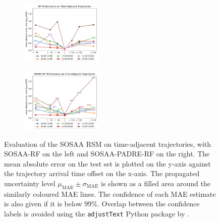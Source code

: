 \begin{figure}[H]
    \centering
    \begin{subfigure}
        \centering
        \includegraphics[width=0.425\textwidth]{evaluation/figures/results/temporal-generalisation-rf.pdf}
    \end{subfigure}
    \begin{subfigure}
        \centering
        \includegraphics[width=0.425\textwidth]{evaluation/figures/results/temporal-generalisation-padre-rf.pdf}
    \end{subfigure}

    \caption[Evaluation of the SOSAA RSM on Time-Adjacent Trajectories]{Evaluation of the SOSAA RSM on time-adjacent trajectories, with SOSAA-RF on the left and SOSAA-PADRE-RF on the right. The mean absolute error on the test set is plotted on the y-axis against the trajectory arrival time offset on the x-axis. The propagated uncertainty level $\mu_{\text{MAE}} \pm \sigma_{\text{MAE}}$ is shown as a filled area around the similarly coloured MAE lines. The confidence of each MAE estimate is also given if it is below $99\%$. Overlap between the confidence labels is avoided using the \texttt{adjustText} Python package by \textcite{matplotlib-adjust-text-2023}.}
    \label{fig:sosaa-rsm-temporal}
\end{figure}

